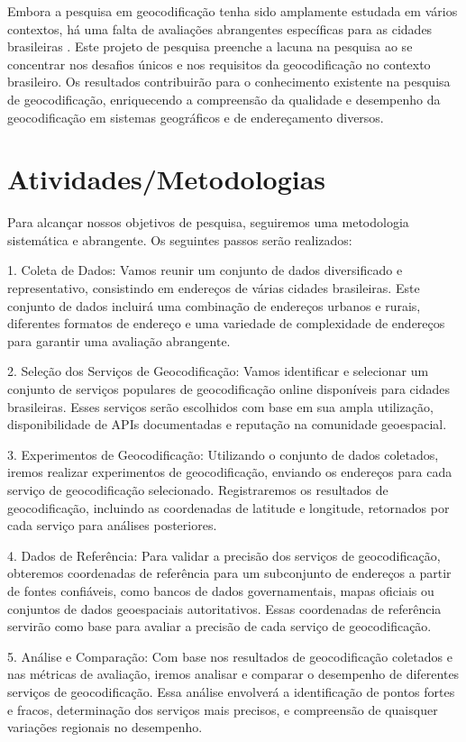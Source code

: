 \documentclass{article}
\begin{document}
Embora a pesquisa em geocodificação tenha sido amplamente estudada em vários contextos, há uma falta de avaliações abrangentes específicas para as cidades brasileiras \cite{}. Este projeto de pesquisa preenche a lacuna na pesquisa ao se concentrar nos desafios únicos e nos requisitos da geocodificação no contexto brasileiro. Os resultados contribuirão para o conhecimento existente na pesquisa de geocodificação, enriquecendo a compreensão da qualidade e desempenho da geocodificação em sistemas geográficos e de endereçamento diversos.
   
\section{Atividades/Metodologias}

Para alcançar nossos objetivos de pesquisa, seguiremos uma metodologia sistemática e abrangente. Os seguintes passos serão realizados:

1. Coleta de Dados: Vamos reunir um conjunto de dados diversificado e representativo, consistindo em endereços de várias cidades brasileiras. Este conjunto de dados incluirá uma combinação de endereços urbanos e rurais, diferentes formatos de endereço e uma variedade de complexidade de endereços para garantir uma avaliação abrangente.

2. Seleção dos Serviços de Geocodificação: Vamos identificar e selecionar um conjunto de serviços populares de geocodificação online disponíveis para cidades brasileiras. Esses serviços serão escolhidos com base em sua ampla utilização, disponibilidade de APIs documentadas e reputação na comunidade geoespacial.

3. Experimentos de Geocodificação: Utilizando o conjunto de dados coletados, iremos realizar experimentos de geocodificação, enviando os endereços para cada serviço de geocodificação selecionado. Registraremos os resultados de geocodificação, incluindo as coordenadas de latitude e longitude, retornados por cada serviço para análises posteriores.

4. Dados de Referência: Para validar a precisão dos serviços de geocodificação, obteremos coordenadas de referência para um subconjunto de endereços a partir de fontes confiáveis, como bancos de dados governamentais, mapas oficiais ou conjuntos de dados geoespaciais autoritativos. Essas coordenadas de referência servirão como base para avaliar a precisão de cada serviço de geocodificação.

5. Análise e Comparação: Com base nos resultados de geocodificação coletados e nas métricas de avaliação, iremos analisar e comparar o desempenho de diferentes serviços de geocodificação. Essa análise envolverá a identificação de pontos fortes e fracos, determinação dos serviços mais precisos, e compreensão de quaisquer variações regionais no desempenho.
\end{document}
